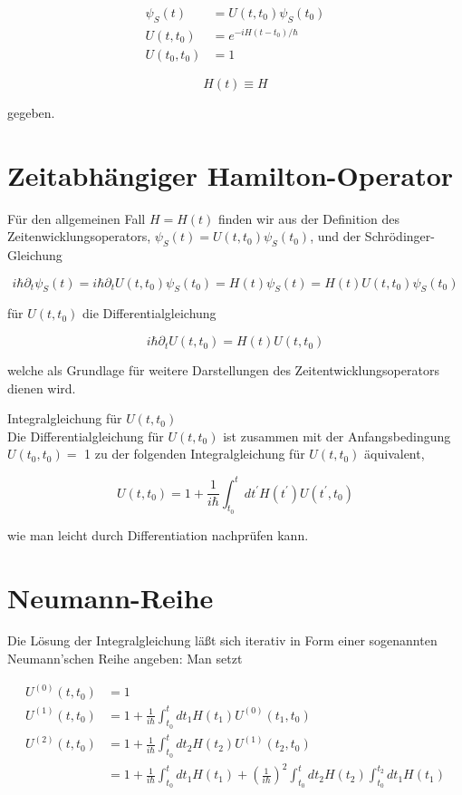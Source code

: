 \documentclass[10pt, letterpaper]{article}
\begin{document}
$$
\begin{aligned}
\psi_{S}(t) & =U\left(t, t_{0}\right) \psi_{S}\left(t_{0}\right) \\
U\left(t, t_{0}\right) & =e^{-i H\left(t-t_{0}\right) / \hbar} \\
U\left(t_{0}, t_{0}\right) & =1
\end{aligned}
$$

$$
H(t) \equiv H
$$

gegeben.

\section*{Zeitabhängiger Hamilton-Operator}
Für den allgemeinen Fall $H=H(t)$ finden wir aus der Definition des Zeitenwicklungsoperators, $\psi_{S}(t)=U\left(t, t_{0}\right) \psi_{S}\left(t_{0}\right)$, und der Schrödinger-Gleichung

$$
i \hbar \partial_{t} \psi_{S}(t)=i \hbar \partial_{t} U\left(t, t_{0}\right) \psi_{S}\left(t_{0}\right)=H(t) \psi_{S}(t)=H(t) U\left(t, t_{0}\right) \psi_{S}\left(t_{0}\right)
$$

für $U\left(t, t_{0}\right)$ die Differentialgleichung

$$
i \hbar \partial_{t} U\left(t, t_{0}\right)=H(t) U\left(t, t_{0}\right)
$$

welche als Grundlage für weitere Darstellungen des Zeitentwicklungsoperators dienen wird.

Integralgleichung für $U\left(t, t_{0}\right)$\\
Die Differentialgleichung für $U\left(t, t_{0}\right)$ ist zusammen mit der Anfangsbedingung $U\left(t_{0}, t_{0}\right)=$ 1 zu der folgenden Integralgleichung für $U\left(t, t_{0}\right)$ äquivalent,

$$
U\left(t, t_{0}\right)=1+\frac{1}{i \hbar} \int_{t_{0}}^{t} d t^{\prime} H\left(t^{\prime}\right) U\left(t^{\prime}, t_{0}\right)
$$

wie man leicht durch Differentiation nachprüfen kann.

\section*{Neumann-Reihe}
Die Lösung der Integralgleichung läßt sich iterativ in Form einer sogenannten Neumann'schen Reihe angeben: Man setzt

$$
\begin{aligned}
U^{(0)}\left(t, t_{0}\right) & =1 \\
U^{(1)}\left(t, t_{0}\right) & =1+\frac{1}{i \hbar} \int_{t_{0}}^{t} d t_{1} H\left(t_{1}\right) U^{(0)}\left(t_{1}, t_{0}\right) \\
U^{(2)}\left(t, t_{0}\right) & =1+\frac{1}{i \hbar} \int_{t_{0}}^{t} d t_{2} H\left(t_{2}\right) U^{(1)}\left(t_{2}, t_{0}\right) \\
& =1+\frac{1}{i \hbar} \int_{t_{0}}^{t} d t_{1} H\left(t_{1}\right)+\left(\frac{1}{i \hbar}\right)^{2} \int_{t_{0}}^{t} d t_{2} H\left(t_{2}\right) \int_{t_{0}}^{t_{2}} d t_{1} H\left(t_{1}\right)
\end{aligned}
$$
\end{document}
